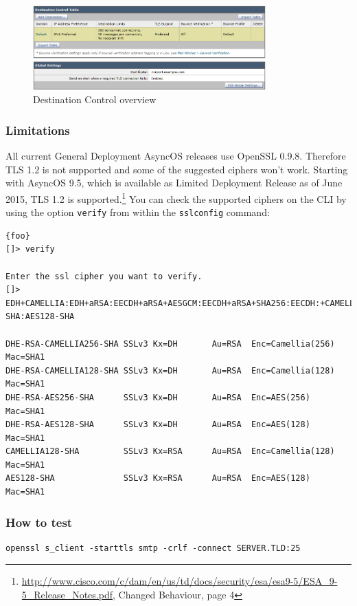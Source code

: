\begin{figure}[p]
  \centering
  \includegraphics[width=0.8\textwidth]{img/ach_ironport_dest_control.png}
  \caption{Destination Control overview}
  \label{fig:ach_ironport_dest_control}
\end{figure}

\subsubsection{Limitations}
All current General Deployment AsyncOS releases use OpenSSL 0.9.8. Therefore TLS 1.2 is not supported and some of the suggested ciphers won't work. Starting with AsyncOS 9.5, which is available as Limited Deployment Release as of June 2015, TLS 1.2 is supported.\footnote{\url{http://www.cisco.com/c/dam/en/us/td/docs/security/esa/esa9-5/ESA_9-5_Release_Notes.pdf}, Changed Behaviour, page 4} You can check the supported ciphers on the CLI by using the option \texttt{verify} from within the \texttt{sslconfig} command:
\begin{lstlisting}{foo}
[]> verify

Enter the ssl cipher you want to verify.
[]> EDH+CAMELLIA:EDH+aRSA:EECDH+aRSA+AESGCM:EECDH+aRSA+SHA256:EECDH:+CAMELLIA128:+AES128:+SSLv3:!aNULL:!eNULL:!LOW:!3DES:!MD5:!EXP:!PSK:!DSS:!RC4:!SEED:!IDEA:!ECDSA:kEDH:CAMELLIA128-SHA:AES128-SHA

DHE-RSA-CAMELLIA256-SHA SSLv3 Kx=DH       Au=RSA  Enc=Camellia(256) Mac=SHA1
DHE-RSA-CAMELLIA128-SHA SSLv3 Kx=DH       Au=RSA  Enc=Camellia(128) Mac=SHA1
DHE-RSA-AES256-SHA      SSLv3 Kx=DH       Au=RSA  Enc=AES(256)  Mac=SHA1
DHE-RSA-AES128-SHA      SSLv3 Kx=DH       Au=RSA  Enc=AES(128)  Mac=SHA1
CAMELLIA128-SHA         SSLv3 Kx=RSA      Au=RSA  Enc=Camellia(128) Mac=SHA1
AES128-SHA              SSLv3 Kx=RSA      Au=RSA  Enc=AES(128)  Mac=SHA1
\end{lstlisting}

\subsubsection{How to test}
\begin{lstlisting}
openssl s_client -starttls smtp -crlf -connect SERVER.TLD:25
\end{lstlisting}

\FloatBarrier %